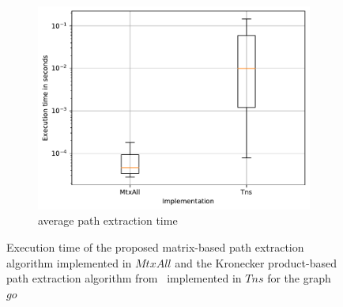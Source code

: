 \begin{figure}
	\hspace*{\fill} %
	\begin{subfigure}{0.32\textwidth}
		\includegraphics[width=\linewidth,trim=0 0 -1.5cm 0]{pictures/go_10_all_matrixall_tensor.pdf}
		\caption{average path extraction time} \label{fig:extractTimeGoAverage}
	\end{subfigure}
	
	\caption{Execution time of the proposed matrix-based path extraction algorithm implemented in $MtxAll$ and the Kronecker product-based path extraction algorithm from~\cite{kron} implemented in $Tns$ for the graph $go$}
	\label{fig:extractTime}
\end{figure}

